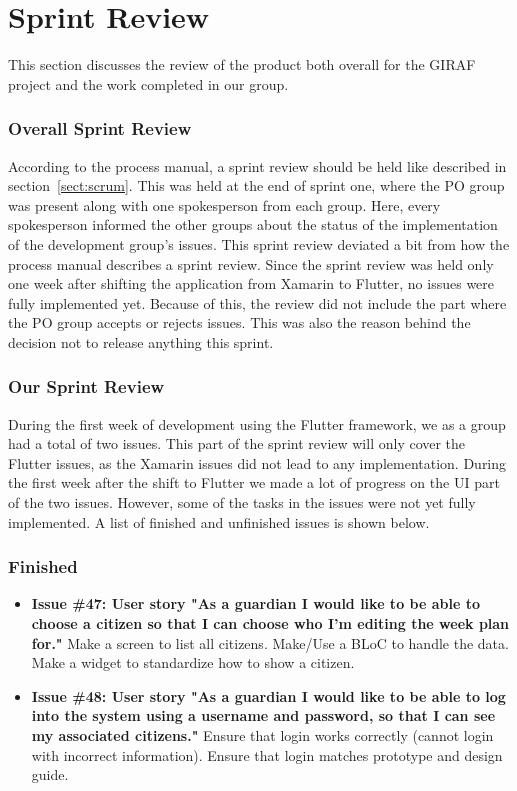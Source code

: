 \section{Sprint Review}
This section discusses the review of the product both overall for the GIRAF project and the work completed in our group.

\subsubsection{Overall Sprint Review}
According to the process manual, a sprint review should be held like described in section~\ref{sect:scrum}.
This was held at the end of sprint one, where the PO group was present along with one spokesperson from each group. 
Here, every spokesperson informed the other groups about the status of the implementation of the development group's issues.
This sprint review deviated a bit from how the process manual describes a sprint review. Since the sprint review was held only one week after shifting the application from Xamarin to Flutter, no issues were fully implemented yet. Because of this, the review did not include the part where the PO group accepts or rejects issues. This was also the reason behind the decision not to release anything this sprint.

\subsubsection{Our Sprint Review}
During the first week of development using the Flutter framework, we as a group had a total of two issues. This part of the sprint review will only cover the Flutter issues, as the Xamarin issues did not lead to any implementation.
During the first week after the shift to Flutter we made a lot of progress on the UI part of the two issues. However, some of the tasks in the issues were not yet fully implemented. A list of finished and unfinished issues is shown below.

\subsubsection{Finished}
\begin{itemize}
    \item \textbf{Issue \#47: User story "As a guardian I would like to be able to choose a citizen so that I can choose who I’m editing the week plan for."}
    \subitem Make a screen to list all citizens.
    \subitem Make/Use a BLoC to handle the data.
    \subitem Make a widget to standardize how to show a citizen.
    
    \item \textbf{Issue \#48: User story "As a guardian I would like to be able to log into the system using a username and password, so that I can see my associated citizens."}
    \subitem Ensure that login works correctly (cannot login with incorrect information).
    \subitem Ensure that login matches prototype and design guide.
\end{itemize}

